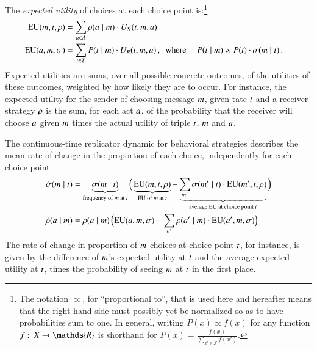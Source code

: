 \documentclass[fleqn,reqno,10pt]{article}
\renewcommand{\Pr}{\ensuremath{P}}
\begin{document}
The \emph{expected utility} of choices at each choice point is:\footnote{The notation
  $\propto$, for ``proportional to'', that is used here and hereafter means that the right-hand
  side must possibly yet be normalized so as to have probabilities sum to one. In general,
  writing $P(x) \propto f(x)$ for any function $f \mycolon X \rightarrow \mathds{R}$ is
  shorthand for $P(x) = \frac{f(x)}{\sum_{x' \in X} f(x')}$. }
\begin{align*}
  \EU(\messg, \state, \Rstrat) & = \sum_{\act \in \Acts}
  \Rstrat(\act \probbar \messg) \cdot U_\sen(\state, \messg, \act) \\
  \EU(\act, \messg, \Sstrat) & = \sum_{\state \in
    \States} P(\state \probbar \messg)  \cdot
  U_\rec(\state, \messg, \act)\,, \text{\ \  where } &
P(\state \probbar \messg) & \propto \Pr(\state) \cdot \Sstrat(\messg \probbar \state) \,.
\end{align*}
Expected utilities are sums, over all possible concrete outcomes, of the utilities of these
outcomes, weighted by how likely they are to occur. For instance, the expected utility for the
sender of choosing message $m$, given tate $t$ and a receiver
strategy $\rho$ is the sum, for each act $a$, of the probability that the
receiver will choose $a$ given $m$ times the actual utility of triple
$t$, $m$ and $a$.

The continuous-time replicator dynamic for behavioral strategies describes the mean rate of
change in the proportion of each choice, independently for each choice point:
\begin{align}
  \label{eq:RDContinuous}
  \dot{\sigma}(m \mid t) & = \underbrace{\sigma(m \mid
    t)}_{\text{frequency of $m$ at $t$}}  \Big ( \underbrace{\mathrm{EU}(m,
  t, \rho)}_{\text{EU of $m$ at $t$}} -   \underbrace{\sum_{m'}
      \sigma(m' \mid t) \cdot \mathrm{EU}(m',t,\rho)}_{\text{average
      EU at choice point $t$}} \Big ) \\
  \dot{\rho}(a \mid m) & = \rho(a \mid m) \thinspace \Big ( \mathrm{EU}(a,
  m, \sigma) -  \sum_{a'} \rho(a' \mid m) \cdot \mathrm{EU}(a',
  m,\sigma)  \Big ) \nonumber
\end{align}
The rate of change in proportion of $m$ choices at choice point $t$, for instance, is
given by the difference of $m$'s expected utility at $t$ and the average expected
utility at $t$, times the probability of seeing $m$ at $t$ in the first place.
\end{document}
